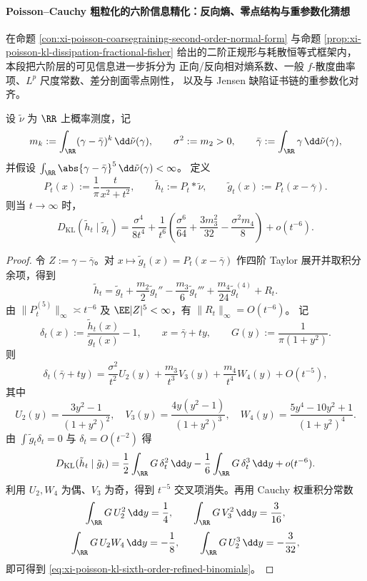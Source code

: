 \paragraph{Poisson--Cauchy 粗粒化的六阶信息精化：反向熵、零点结构与重参数化猜想}
在命题 \ref{con:xi-poisson-coarsegraining-second-order-normal-form} 与命题
\ref{prop:xi-poisson-kl-dissipation-fractional-fisher}
给出的二阶正规形与耗散恒等式框架内，本段把六阶层的可见信息进一步拆分为
正向/反向相对熵系数、一般 \(f\)-散度曲率项、\(L^p\) 尺度常数、差分剖面零点刚性，
以及与 Jensen 缺陷证书链的重参数化对齐。

\begin{theorem}\label{thm:xi-poisson-kl-sixth-order-refined-binomials}
设 \(\tilde\nu\) 为 \(\RR\) 上概率测度，记
\[
m_k:=\int_{\RR}(\gamma-\bar\gamma)^k\,\dd\tilde\nu(\gamma),\qquad
\sigma^2:=m_2>0,\qquad
\bar\gamma:=\int_{\RR}\gamma\,\dd\tilde\nu(\gamma),
\]
并假设
\(
\int_{\RR}\abs{\gamma-\bar\gamma}^5\,\dd\tilde\nu(\gamma)<\infty
\)。
定义
\[
P_t(x):=\frac{1}{\pi}\frac{t}{x^2+t^2},\qquad
\tilde h_t:=P_t*\tilde\nu,\qquad
\tilde g_t(x):=P_t(x-\bar\gamma).
\]
则当 \(t\to\infty\) 时，
\begin{equation}\label{eq:xi-poisson-kl-sixth-order-refined-binomials}
D_{\mathrm{KL}}(\tilde h_t\mid \tilde g_t)
=\frac{\sigma^4}{8t^4}
+\frac{1}{t^6}\left(
\frac{\sigma^6}{64}
+\frac{3m_3^2}{32}
-\frac{\sigma^2m_4}{8}
\right)
+o(t^{-6}).
\end{equation}
\end{theorem}

\begin{proof}
令 \(Z:=\gamma-\bar\gamma\)。对 \(x\mapsto \tilde g_t(x)=P_t(x-\bar\gamma)\) 作四阶 Taylor 展开并取积分余项，得到
\[
\tilde h_t
=\tilde g_t+\frac{m_2}{2}\tilde g_t''
-\frac{m_3}{6}\tilde g_t'''
+\frac{m_4}{24}\tilde g_t^{(4)}+R_t.
\]
由 \(\|P_t^{(5)}\|_\infty\asymp t^{-6}\) 及 \(\EE|Z|^5<\infty\)，有 \(\|R_t\|_\infty=O(t^{-6})\)。
记
\[
\delta_t(x):=\frac{\tilde h_t(x)}{\tilde g_t(x)}-1,\qquad
x=\bar\gamma+ty,\qquad
G(y):=\frac{1}{\pi(1+y^2)}.
\]
则
\[
\delta_t(\bar\gamma+ty)
=\frac{\sigma^2}{t^2}U_2(y)
+\frac{m_3}{t^3}V_3(y)
+\frac{m_4}{t^4}W_4(y)
+O(t^{-5}),
\]
其中
\[
U_2(y)=\frac{3y^2-1}{(1+y^2)^2},\quad
V_3(y)=\frac{4y(y^2-1)}{(1+y^2)^3},\quad
W_4(y)=\frac{5y^4-10y^2+1}{(1+y^2)^4}.
\]
由 \(\int \tilde g_t\delta_t=0\) 与 \(\delta_t=O(t^{-2})\) 得
\[
D_{\mathrm{KL}}(\tilde h_t\mid \tilde g_t)
=\frac12\int_{\RR}G\,\delta_t^2\,\dd y
-\frac16\int_{\RR}G\,\delta_t^3\,\dd y
+o(t^{-6}).
\]
利用 \(U_2,W_4\) 为偶、\(V_3\) 为奇，得到 \(t^{-5}\) 交叉项消失。再用 Cauchy 权重积分常数
\[
\int_{\RR}G\,U_2^2\,\dd y=\frac14,\qquad
\int_{\RR}G\,V_3^2\,\dd y=\frac{3}{16},
\]
\[
\int_{\RR}G\,U_2W_4\,\dd y=-\frac18,\qquad
\int_{\RR}G\,U_2^3\,\dd y=-\frac{3}{32},
\]
即可得到 \eqref{eq:xi-poisson-kl-sixth-order-refined-binomials}。
\end{proof}

